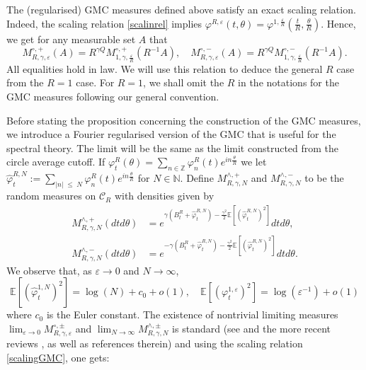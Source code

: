 \documentclass[11pt]{amsart}
\numberwithin{equation}{section}
\newcounter{exa}
\theoremstyle{definition}
\renewcommand{\leq}{\;\leqslant\;}                   %
\newcommand{\Z}{\mathbb{Z}}
\newcommand{\N}{\mathbb{N}}
\def\E{\mathbb{E}}
\newcommand{\mc}{\mathcal}
\def\eps{\varepsilon}
\begin{document}
The (regularised) GMC measures defined above satisfy an exact scaling relation. Indeed, the scaling relation \eqref{scalinrel} implies 
$\varphi^{R,\eps}(t, \theta)=\varphi^{1,\frac{\eps}{R}}(\frac{t}{R}, \frac{\theta}{R})$. Hence, we get for any measurable set $A$ that 
\begin{equation}\label{scalingGMC}
M^{\circ,+}_{R,\gamma,\eps}(A)= R^{\gamma Q} M^{\circ,+}_{1,\gamma, \frac{\eps}{R}}(R^{-1}A), 
\quad
 M^{\circ,-}_{R,\gamma,\eps}(A)= R^{\gamma Q} M^{\circ,-}_{1,\gamma, \frac{\eps}{R}}(R^{-1}A).
\end{equation}
All equalities hold in law. We will use this relation to deduce the general $R$ case from the $R=1$ case. For $R=1$, we shall 
omit the $R$ in the notations for the GMC measures following our general convention.

Before stating the proposition concerning the construction of the GMC measures, we introduce a Fourier regularised version of the GMC that is useful for the spectral theory. The limit will be the same as the limit constructed from the circle average cutoff. If 
$\varphi^R_t(\theta)=\sum_{n\in \Z}\varphi^R_n(t)e^{in\frac{\theta}{R}}$ we 
 let $\hat{\varphi}^{R,N}_t:=\sum_{|n|\leq N}\varphi^R_n(t)e^{in\frac{\theta}{R}}$ for $N\in \N$. 
 Define $M^{\wedge,+}_{R,\gamma,N}$ and $M^{\wedge,-}_{R,\gamma,N}$ to be the random measures on $\mc{C}_R$ with densities given by 
 \begin{align*}
M^{\wedge,+}_{R,\gamma,N}(dtd\theta)
&=
e^{\gamma (B_t^R + \hat{\varphi}_t^{R,N})-\frac{\gamma^2}{2}\E[ (\hat{\varphi}_t^{R,N})^2]} dtd\theta, 
\\
M^{\wedge,-}_{R,\gamma,N}(dtd\theta)
&=
  e^{-\gamma(B_t^R+\hat{\varphi}_t^{R,N})-\frac{\gamma^2}{2}\E[ (\hat{\varphi}_t^{R,N})^2]} dtd\theta.
\end{align*}
We observe that, as $\eps\to 0$ and $N\to \infty$,
\[ \E[ (\hat{\varphi}_t^{1,N})^2]=\log(N)+c_0+o(1), \quad  \E[ (\varphi_t^{1,\eps})^2]=\log(\eps^{-1})+o(1)\]
where $c_0$ is the Euler constant.
The existence of nontrivial limiting measures $\lim_{\eps\to 0}M^{\circ,\pm}_{R,\gamma,\eps}$ and $\lim_{N\to \infty}M^{\wedge,\pm}_{R,\gamma,N}$ is standard (see \cite{Kahane85} and the more recent reviews \cite{rhodes2014_gmcReview,Berestycki_lqggff}, as well as references therein) and using the scaling relation \eqref{scalingGMC}, one gets:
\end{document}
